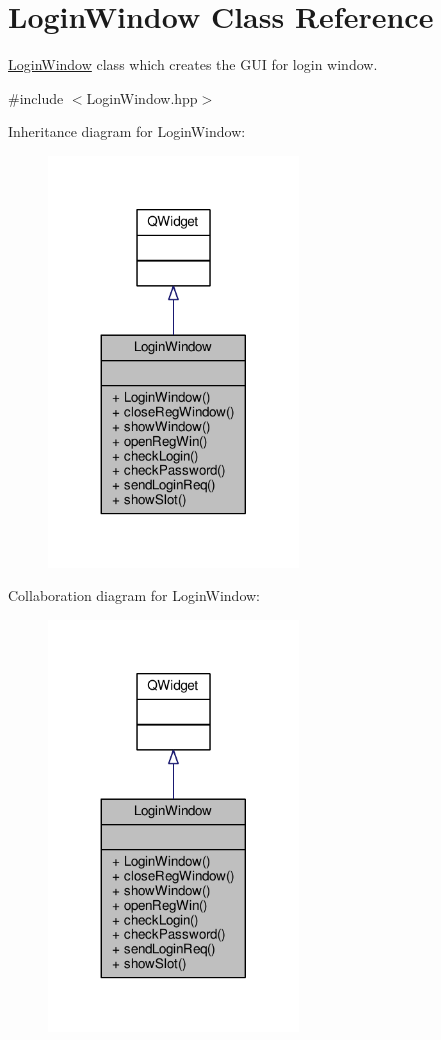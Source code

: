 \hypertarget{classLoginWindow}{}\section{Login\+Window Class Reference}
\label{classLoginWindow}


\hyperlink{classLoginWindow}{Login\+Window} class which creates the G\+UI for login window.  




{\ttfamily \#include $<$Login\+Window.\+hpp$>$}



Inheritance diagram for Login\+Window\+:
\nopagebreak
\begin{figure}[H]
\begin{center}
\leavevmode
\includegraphics[width=188pt]{classLoginWindow__inherit__graph}
\end{center}
\end{figure}


Collaboration diagram for Login\+Window\+:
\nopagebreak
\begin{figure}[H]
\begin{center}
\leavevmode
\includegraphics[width=188pt]{classLoginWindow__coll__graph}
\end{center}
\end{figure}
